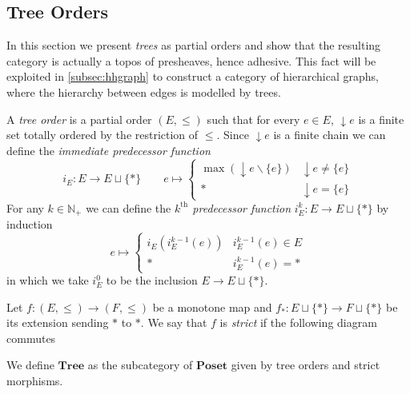 \documentclass[runningheads,envcountsect]{lmcs}
\newcommand{\catname}[1]{\mathbf{#1}}
\newcommand{\pred}[1]{{\downarrow}#1}
\newcommand{\tree}{\catname{Tree}}
\theoremstyle{plain}
\theoremstyle{definition}
\begin{document}
\subsection{Tree Orders}
In this section we present \emph{trees} as partial orders and show that the resulting category is actually a topos of presheaves, hence adhesive.
This fact will be exploited in \cref{subsec:hhgraph} to construct a category of hierarchical graphs, where the hierarchy between edges is modelled by trees. 
\begin{defi}
	A \emph{tree order} is a partial order $(E, \leq)$ such that for every $e\in E$, $\pred{e}$ is a finite set totally ordered by the restriction of $\leq$. Since $\pred{e}$ is a finite chain we can define the \emph{immediate predecessor function}
	\begin{equation*}
		i_E:E\rightarrow E\sqcup \{\ast\}\qquad 
		e \mapsto \begin{cases}
			\max(\pred{e}\smallsetminus\{e\}) & \pred{e}\neq \{e\}\\
			\ast &\pred{e}=\{e\}
		\end{cases}
	\end{equation*}
	For any $k\in \mathbb{N}_+$ we can define the \emph{$k^\text{th}$ predecessor function} $i^k_E:E\rightarrow E\sqcup \{\ast\}$ by induction
	\begin{equation*}
		e \mapsto \begin{cases}
			i_E(i_E^{k-1}(e)) & i_E^{k-1}(e)\in E\\
			\ast & i_E^{k-1}(e)=\ast 
		\end{cases}
	\end{equation*}
	in which we take $i^0_E$ to be the inclusion $E\rightarrow E\sqcup\{*\}$.
	
	\noindent
	Let $f:(E, \leq)\rightarrow (F, \leq)$ be a monotone map and $f_\ast:E\sqcup \{\ast\}\rightarrow F\sqcup \{\ast\}$ be its extension sending $\ast$ to  $\ast $. 
	We say that $f$ is \emph{strict} if the following diagram commutes
	\begin{center}
	\end{center}
	We define $\tree$ as the subcategory of $\catname{Poset}$ given by tree orders and strict morphisms.
\end{defi}
\end{document}
